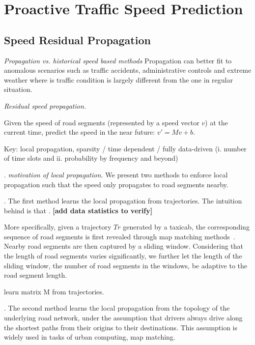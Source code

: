 \section{Proactive Traffic Speed Prediction}
\label{sec-method}


\subsection{Speed Residual Propagation}
\label{subsec-propagation}

{\em Propagation vs. historical speed based methods}
Propagation can better fit to anomalous scenarios such as traffic accidents, administrative controls and extreme weather where is traffic condition is largely different from the one in regular situation.

{\em Residual speed propagation.}

Given the speed of road segments (represented by a speed vector $v$) at the current time, predict the speed in the near future: $v'=Mv+b$.

Key: local propagation, \ie sparsity / time dependent / fully data-driven (i. number of time slots and ii. probability by frequency and beyond)


.
{\em motivation of local propagation.}
We present two methods to enforce local propagation such that the speed only propagates to road segments nearby.

.
The first method learns the local propagation from trajectories. The intuition behind is that {\em }. {\bf [add data statistics to verify]}

More specifically, given a trajectory $Tr$ generated by a taxicab, the corresponding sequence of road segments is first revealed through map matching methods~\cite{Newson2009MM}. Nearby road segments are then captured by a sliding window. Considering that the length of road segments varies significantly, we further let the length of the sliding window, \ie the number of road segments in the windows, be adaptive to the road segment length.

\begin{example}
learn matrix M from trajectories.
\end{example}

.
The second method learns the local propagation from the topology of the underlying road network, under the assumption that drivers always drive along the shortest paths from their origins to their destinations. This assumption is widely used in tasks of urban computing, \eg map matching.

